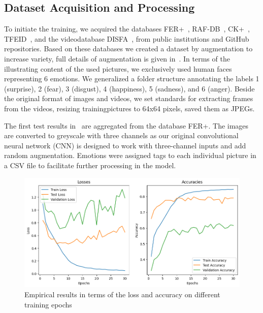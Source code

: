 \subsection{Dataset Acquisition and Processing}
\label{sec:datasets}
To initiate the training, 
we acquired the databases FER+~\cite{BarsoumZCZ16}, RAF-DB~\cite{li2019reliable}, CK+~\cite{LuceyCKSAM10}, TFEID~\cite{tfeid}, and the videodatabase DISFA~\cite{MavadatiMBTC13}, from public institutions and GitHub repositories.
Based on these databases we created a dataset by augmentation to increase variety, 
full details of augmentation is given in~. 
In terms of the illustrating content of the used pictures, we exclusively used human faces representing 6 emotions. We generalized a folder structure annotating the labels 1 (surprise), 2 (fear), 3 (disgust), 4 (happiness), 5 (sadness), and 6 (anger). 
Beside the original format of images and videos, we set standards for extracting frames from the videos, resizing trainingpictures to 64x64 pixels, saved them as JPEGs.

The first test results in~ are aggregated from the database FER+. 
The images are converted to greyscale with three channels as our original convolutional neural network (CNN) is designed to work with three-channel inputs and add random augmentation. 
Emotions were assigned tags to each individual picture in a CSV file to facilitate further processing in the model.

\begin{figure}[ht]
  \centering
   \includegraphics[width=\linewidth]{output.png}
   \caption{Empirical results in terms of the loss and accuracy on different training epochs}
   \label{fig:result}
\end{figure}

